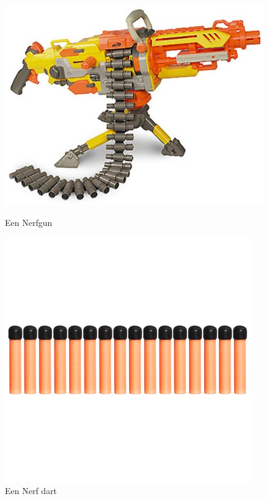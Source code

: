 \begin{figure}[H]
    \begin{minipage}{0.45\textwidth}
        \includegraphics[width=\linewidth]{figures/nerfgun.jpg}
        \caption{Een Nerfgun}
        \label{fig:nerf}
    \end{minipage}
    \begin{minipage}{0.45\textwidth}
        \includegraphics[scale=.5,width=\linewidth]{figures/nerfdart.png}
        \caption{Een Nerf dart}
        \label{fig:nerfdart}
    \end{minipage}
\end{figure}
